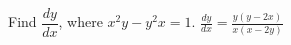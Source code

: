 {Find $\dfrac{dy}{dx}$, where $x^2y-y^2x = 1$. 
}
{ $\frac{dy}{dx} = \frac{y (y-2 x)}{x (x-2 y)}$
}
